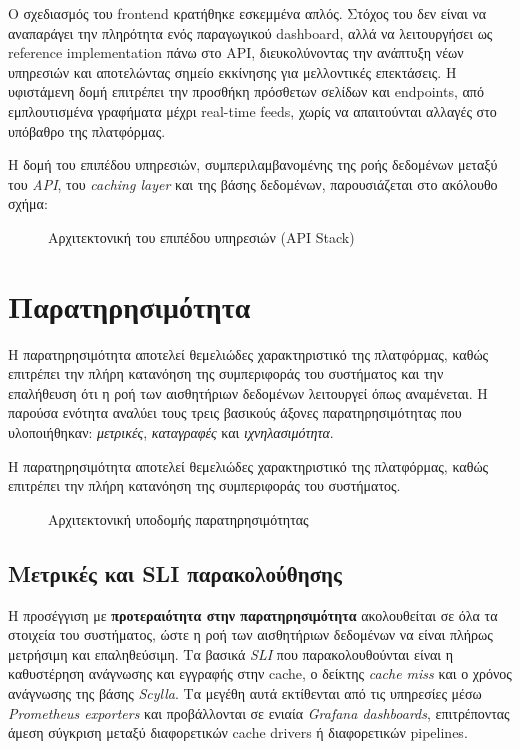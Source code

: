 Ο σχεδιασμός του frontend κρατήθηκε εσκεμμένα απλός. Στόχος του δεν είναι να
αναπαράγει την πληρότητα ενός παραγωγικού dashboard, αλλά να λειτουργήσει ως
reference implementation πάνω στο API, διευκολύνοντας την ανάπτυξη νέων
υπηρεσιών και αποτελώντας σημείο εκκίνησης για μελλοντικές επεκτάσεις. Η
υφιστάμενη δομή επιτρέπει την προσθήκη πρόσθετων σελίδων και endpoints, από
εμπλουτισμένα γραφήματα μέχρι real-time feeds, χωρίς να απαιτούνται αλλαγές στο
υπόβαθρο της πλατφόρμας.

Η δομή του επιπέδου υπηρεσιών, συμπεριλαμβανομένης της ροής δεδομένων μεταξύ
του \textit{API}, του \textit{caching layer} και της βάσης δεδομένων,
παρουσιάζεται στο ακόλουθο σχήμα:

\begin{figure}[H]
	\centering
	\makebox[\textwidth]{%
	}
	\caption{Αρχιτεκτονική του επιπέδου υπηρεσιών (API Stack)}
	\label{fig:api-stack-arch}
\end{figure}

\section{Παρατηρησιμότητα}

Η παρατηρησιμότητα αποτελεί θεμελιώδες χαρακτηριστικό της πλατφόρμας, καθώς
επιτρέπει την πλήρη κατανόηση της συμπεριφοράς του συστήματος και την
επαλήθευση ότι η ροή των αισθητήριων δεδομένων λειτουργεί όπως αναμένεται. Η
παρούσα ενότητα αναλύει τους τρεις βασικούς άξονες παρατηρησιμότητας που
υλοποιήθηκαν: \textit{μετρικές}, \textit{καταγραφές} και
\textit{ιχνηλασιμότητα}.

Η παρατηρησιμότητα αποτελεί θεμελιώδες χαρακτηριστικό της πλατφόρμας, καθώς
επιτρέπει την πλήρη κατανόηση της συμπεριφοράς του συστήματος.

\begin{figure}[H]
	\centering
	\makebox[\textwidth]{%
	}
	\caption{Αρχιτεκτονική υποδομής παρατηρησιμότητας}
	\label{fig:observability-stack}
\end{figure}

\subsection{Μετρικές και SLI παρακολούθησης}

Η προσέγγιση με \textbf{προτεραιότητα στην παρατηρησιμότητα} ακολουθείται σε
όλα τα στοιχεία του συστήματος, ώστε η ροή των αισθητήριων δεδομένων να είναι
πλήρως μετρήσιμη και επαληθεύσιμη. Τα βασικά \textit{SLI} που παρακολουθούνται
είναι η καθυστέρηση ανάγνωσης και εγγραφής στην cache, ο δείκτης \textit{cache
	miss} και ο χρόνος ανάγνωσης της βάσης \textit{Scylla}. Τα μεγέθη αυτά
εκτίθενται από τις υπηρεσίες μέσω \textit{Prometheus exporters} και
προβάλλονται σε ενιαία \textit{Grafana dashboards}, επιτρέποντας άμεση σύγκριση
μεταξύ διαφορετικών cache drivers ή διαφορετικών pipelines.

